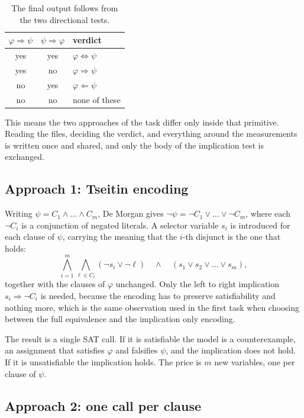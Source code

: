\documentclass[11pt,a4paper]{article}
\begin{document}
\begin{table}[H]
\centering
\begin{tabular}{ccl}
\toprule
$\varphi \Rightarrow \psi$ & $\psi \Rightarrow \varphi$ & verdict \\
\midrule
yes & yes & $\varphi \Leftrightarrow \psi$ \\
yes & no  & $\varphi \Rightarrow \psi$ \\
no  & yes & $\varphi \Leftarrow \psi$ \\
no  & no  & none of these \\
\bottomrule
\end{tabular}
\caption{The final output follows from the two directional tests.}
\label{tab:verdict}
\end{table}

This means the two approaches of the task differ only inside that primitive.
Reading the files, deciding the verdict, and everything around the
measurements is written once and shared, and only the body of the implication
test is exchanged.

\subsection*{Approach 1: Tseitin encoding}

Writing $\psi = C_1 \wedge \dots \wedge C_m$, De Morgan gives
$\neg \psi = \neg C_1 \vee \dots \vee \neg C_m$, where each $\neg C_i$ is a
conjunction of negated literals. A selector variable $s_i$ is introduced for
each clause of $\psi$, carrying the meaning that the $i$-th disjunct is the
one that holds:
\[
  \bigwedge_{i=1}^{m} \bigwedge_{\ell \in C_i}
  \left( \neg s_i \vee \neg \ell \right)
  \quad \wedge \quad
  \left( s_1 \vee s_2 \vee \dots \vee s_m \right),
\]
together with the clauses of $\varphi$ unchanged. Only the left to right
implication $s_i \Rightarrow \neg C_i$ is needed, because the encoding has to
preserve satisfiability and nothing more, which is the same observation used
in the first task when choosing between the full equivalence and the
implication only encoding.

The result is a single SAT call. If it is satisfiable the model is a
counterexample, an assignment that satisfies $\varphi$ and falsifies $\psi$,
and the implication does not hold. If it is unsatisfiable the implication
holds. The price is $m$ new variables, one per clause of $\psi$.

\subsection*{Approach 2: one call per clause}
\end{document}
